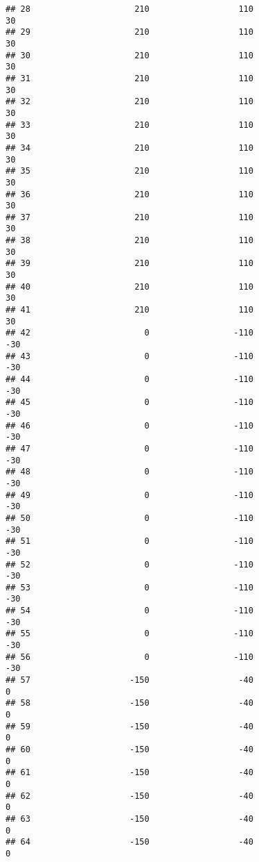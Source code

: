 \documentclass[]{article}
\begin{document}
\begin{verbatim}
## 28                     210                  110                   30
## 29                     210                  110                   30
## 30                     210                  110                   30
## 31                     210                  110                   30
## 32                     210                  110                   30
## 33                     210                  110                   30
## 34                     210                  110                   30
## 35                     210                  110                   30
## 36                     210                  110                   30
## 37                     210                  110                   30
## 38                     210                  110                   30
## 39                     210                  110                   30
## 40                     210                  110                   30
## 41                     210                  110                   30
## 42                       0                 -110                  -30
## 43                       0                 -110                  -30
## 44                       0                 -110                  -30
## 45                       0                 -110                  -30
## 46                       0                 -110                  -30
## 47                       0                 -110                  -30
## 48                       0                 -110                  -30
## 49                       0                 -110                  -30
## 50                       0                 -110                  -30
## 51                       0                 -110                  -30
## 52                       0                 -110                  -30
## 53                       0                 -110                  -30
## 54                       0                 -110                  -30
## 55                       0                 -110                  -30
## 56                       0                 -110                  -30
## 57                    -150                  -40                    0
## 58                    -150                  -40                    0
## 59                    -150                  -40                    0
## 60                    -150                  -40                    0
## 61                    -150                  -40                    0
## 62                    -150                  -40                    0
## 63                    -150                  -40                    0
## 64                    -150                  -40                    0

\end{verbatim}
\end{document}
